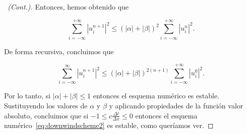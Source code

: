 \begin{frame}
    \frametitle{\secname}
    \begin{proof}[\proofname\ (Cont.)]
        Entonces, hemos obtenido que

        \begin{equation*}
            \sum_{i=-\infty}^{+\infty}
            {\left|u^{n+1}_{i}\right|}^{2}\leq
            {
                \left(\left|\alpha\right|+
                \left|\beta\right|\right)
            }^{2}
            \sum_{i=-\infty}^{+\infty}
            {\left|u^{n}_{i}\right|}^{2}.
        \end{equation*}

        De forma recursiva, concluimos que

        \begin{equation*}
            \sum_{i=-\infty}^{\infty}
            {\left|u^{n+1}_{i}\right|}^{2}\leq
            {
                \left(
                \left|\alpha\right|+
                \left|\beta\right|
                \right)
            }^{2\left(n+1\right)}
            \sum_{i=-\infty}^{+\infty}
            {\left|u^{0}_{i}\right|}^{2}.
        \end{equation*}

        Por lo tanto, si
        \begin{math}
            \left|\alpha\right|+
            \left|\beta\right|\leq
            1
        \end{math}
        entonces el esquema numérico es estable.
        Sustituyendo los valores de $\alpha$ y $\beta$ y aplicando
        propiedades de la función valor absoluto, concluimos que si
        \begin{math}
            -1\leq
            c\frac{\Delta t}{\Delta x}\leq
            0
        \end{math}
        entonces el esquema numérico~\eqref{eq:downwindscheme2} es estable, como queríamos ver.
    \end{proof}
\end{frame}

